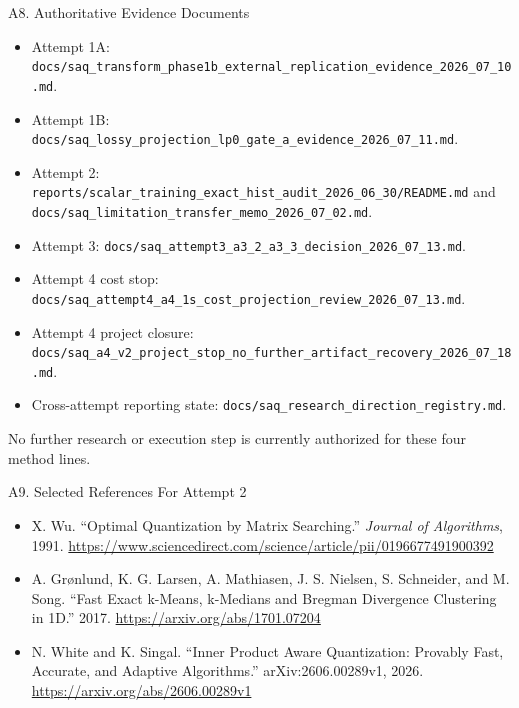 \documentclass[
  ignorenonframetext,
  aspectratio=169,
]{beamer}
\providecommand{\tightlist}{%
  \setlength{\itemsep}{0pt}\setlength{\parskip}{0pt}}
\begin{document}
\begin{frame}[fragile]{A8. Authoritative Evidence Documents}
\protect{}\label{a8-authoritative-evidence-documents}
\small

\begin{itemize}
\tightlist
\item
  Attempt 1A:
  \texttt{docs/saq\_transform\_phase1b\_external\_replication\_evidence\_2026\_07\_10.md}.
\item
  Attempt 1B:
  \texttt{docs/saq\_lossy\_projection\_lp0\_gate\_a\_evidence\_2026\_07\_11.md}.
\item
  Attempt 2:
  \texttt{reports/scalar\_training\_exact\_hist\_audit\_2026\_06\_30/README.md}
  and \texttt{docs/saq\_limitation\_transfer\_memo\_2026\_07\_02.md}.
\item
  Attempt 3:
  \texttt{docs/saq\_attempt3\_a3\_2\_a3\_3\_decision\_2026\_07\_13.md}.
\item
  Attempt 4 cost stop:
  \texttt{docs/saq\_attempt4\_a4\_1s\_cost\_projection\_review\_2026\_07\_13.md}.
\item
  Attempt 4 project closure:
  \texttt{docs/saq\_a4\_v2\_project\_stop\_no\_further\_artifact\_recovery\_2026\_07\_18.md}.
\item
  Cross-attempt reporting state:
  \texttt{docs/saq\_research\_direction\_registry.md}.
\end{itemize}

No further research or execution step is currently authorized for these
four method lines.
\end{frame}

\begin{frame}{A9. Selected References For Attempt 2}
\protect{}\label{a9-selected-references-for-attempt-2}
\begin{itemize}
\tightlist
\item
  X. Wu. ``Optimal Quantization by Matrix Searching.'' \emph{Journal of
  Algorithms}, 1991.
  \url{https://www.sciencedirect.com/science/article/pii/0196677491900392}
\item
  A. Grønlund, K. G. Larsen, A. Mathiasen, J. S. Nielsen, S. Schneider,
  and M. Song. ``Fast Exact k-Means, k-Medians and Bregman Divergence
  Clustering in 1D.'' 2017. \url{https://arxiv.org/abs/1701.07204}
\item
  N. White and K. Singal. ``Inner Product Aware Quantization: Provably
  Fast, Accurate, and Adaptive Algorithms.'' arXiv:2606.00289v1, 2026.
  \url{https://arxiv.org/abs/2606.00289v1}
\end{itemize}
\end{frame}
\end{document}
